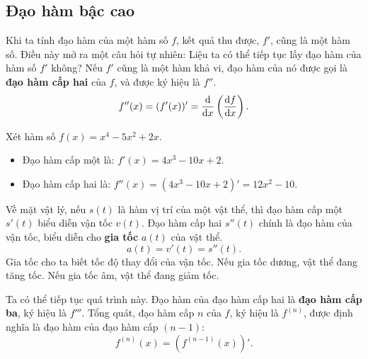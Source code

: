 \subsection{Đạo hàm bậc cao}

Khi ta tính đạo hàm của một hàm số $f$, kết quả thu được, $f'$, cũng là một hàm số. Điều này mở ra một câu hỏi tự nhiên: Liệu ta có thể tiếp tục lấy đạo hàm của hàm số $f'$ không? Nếu $f'$ cũng là một hàm khả vi, đạo hàm của nó được gọi là \textbf{đạo hàm cấp hai} của $f$, và được ký hiệu là $f''$.
\[ f''(x) = (f'(x))' = \frac{\mathrm{d}}{\mathrm{d}x} \left( \frac{\mathrm{d}f}{\mathrm{d}x} \right). \]

\begin{example}
    Xét hàm số $f(x) = x^4 - 5x^2 + 2x$.
    \begin{itemize}
        \item Đạo hàm cấp một là: $f'(x) = 4x^3 - 10x + 2$.
        \item Đạo hàm cấp hai là: $f''(x) = (4x^3 - 10x + 2)' = 12x^2 - 10$.
    \end{itemize}
\end{example}

Về mặt vật lý, nếu $s(t)$ là hàm vị trí của một vật thể, thì đạo hàm cấp một $s'(t)$ biểu diễn vận tốc $v(t)$. Đạo hàm cấp hai $s''(t)$ chính là đạo hàm của vận tốc, biểu diễn cho \textbf{gia tốc} $a(t)$ của vật thể.
\[ a(t) = v'(t) = s''(t). \]
Gia tốc cho ta biết tốc độ thay đổi của vận tốc. Nếu gia tốc dương, vật thể đang tăng tốc. Nếu gia tốc âm, vật thể đang giảm tốc.

Ta có thể tiếp tục quá trình này. Đạo hàm của đạo hàm cấp hai là \textbf{đạo hàm cấp ba}, ký hiệu là $f'''$. Tổng quát, đạo hàm cấp $n$ của $f$, ký hiệu là $f^{(n)}$, được định nghĩa là đạo hàm của đạo hàm cấp $(n-1)$:
\[ f^{(n)}(x) = (f^{(n-1)}(x))'. \]


